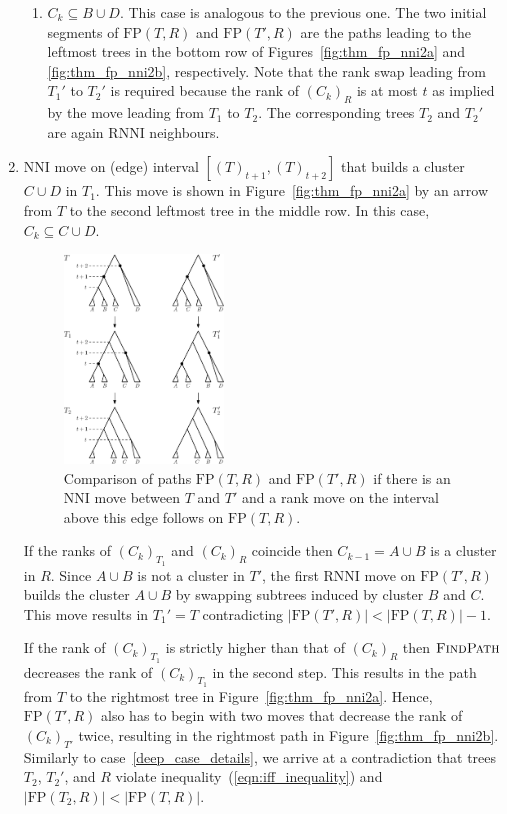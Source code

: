 \documentclass[11pt]{amsart}
\newcommand{\rnni}{\mathrm{RNNI}}
\newcommand{\findpath}{\textsc{FindPath}}
\newcommand{\nni}{\mathrm{NNI}}
\newcommand{\fp}{\mathrm{FP}}
\begin{document}
\begin{enumerate}[label = 1.{\arabic*}]
\begin{enumerate}[label = \theenumi.\arabic*]
\item $C_k \subseteq B \cup D$.
This case is analogous to the previous one.
The two initial segments of $\fp(T, R)$ and $\fp(T', R)$ are the paths leading to the leftmost trees in the bottom row of Figures~\ref{fig:thm_fp_nni2a} and \ref{fig:thm_fp_nni2b}, respectively.
Note that the rank swap leading from $T_1'$ to $T_2'$ is required because the rank of $(C_k)_R$ is at most $t$ as implied by the move leading from $T_1$ to $T_2$.
The corresponding trees $T_2$ and $T_2'$ are again $\rnni$ neighbours.
\end{enumerate}

\item $\nni$ move on (edge) interval $[(T)_{t+1}, (T)_{t+2}]$ that builds a cluster $C \cup D$ in $T_1$.
\label{case:one_or_two_moves_down}
This move is shown in Figure~\ref{fig:thm_fp_nni2a} by an arrow from $T$ to the second leftmost tree in the middle row.
In this case, $C_k \subseteq C \cup D$.

\begin{figure}[ht]
	\centering
	\includegraphics[width=0.4\textwidth]{thm_fp_nni3}
	\caption{Comparison of paths $\fp(T, R)$ and $\fp(T', R)$ if there is an $\nni$ move between $T$ and $T'$ and a rank move on the interval above this edge follows on $\fp(T, R)$.}
	\label{fig:thm_fp_nni3}
\end{figure}

If the ranks of $(C_k)_{T_1}$ and $(C_k)_R$ coincide then $C_{k-1} = A \cup B$ is a cluster in $R$.
Since $A \cup B$ is not a cluster in $T'$, the first $\rnni$ move on $\fp(T', R)$ builds the cluster $A \cup B$ by swapping subtrees induced by cluster $B$ and $C$.
This move results in $T_1' = T$ contradicting $|\fp(T',R)| < |\fp(T,R)| - 1$.

If the rank of $(C_k)_{T_1}$ is strictly higher than that of $(C_k)_R$ then $\findpath$ decreases the rank of $(C_k)_{T_1}$ in the second step.
This results in the path from $T$ to the rightmost tree in Figure~\ref{fig:thm_fp_nni2a}.
Hence, $\fp(T', R)$ also has to begin with two moves that decrease the rank of $(C_k)_{T'}$ twice, resulting in the rightmost path in Figure~\ref{fig:thm_fp_nni2b}.
Similarly to case~\ref{deep_case_details}, we arrive at a contradiction that trees $T_2$, $T_2'$, and $R$ violate inequality~(\ref{eqn:iff_inequality}) and $|\fp(T_2,R)| < |\fp(T,R)|$.


\end{enumerate}
\end{document}
